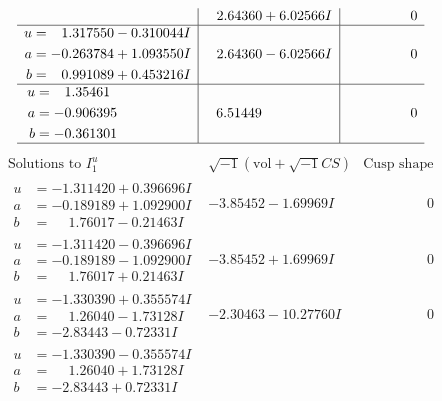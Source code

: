 \documentclass[1p]{elsarticle_modified}
\theoremstyle{definition}
\newcommand{\I}{\sqrt{-1}}
\begin{document}
$$\begin{array}{c|c|c}
 & \phantom{-}2.64360 + 6.02566 I & \phantom{-0.000000 } 0 \\ \hline\begin{aligned}
u &= \phantom{-}1.317550 - 0.310044 I \\
a &= -0.263784 + 1.093550 I \\
b &= \phantom{-}0.991089 + 0.453216 I\end{aligned}
 & \phantom{-}2.64360 - 6.02566 I & \phantom{-0.000000 } 0 \\ \hline\begin{aligned}
u &= \phantom{-}1.35461\phantom{ +0.000000I} \\
a &= -0.906395\phantom{ +0.000000I} \\
b &= -0.361301\phantom{ +0.000000I}\end{aligned}
 & \phantom{-}6.51449\phantom{ +0.000000I} & \phantom{-0.000000 } 0\\
 \hline 
 \end{array}$$\newpage$$\begin{array}{c|c|c}  
\text{Solutions to }I^u_{1}& \I (\text{vol} + \sqrt{-1}CS) & \text{Cusp shape}\\
 \hline 
\begin{aligned}
u &= -1.311420 + 0.396696 I \\
a &= -0.189189 + 1.092900 I \\
b &= \phantom{-}1.76017 - 0.21463 I\end{aligned}
 & -3.85452 - 1.69969 I & \phantom{-0.000000 } 0 \\ \hline\begin{aligned}
u &= -1.311420 - 0.396696 I \\
a &= -0.189189 - 1.092900 I \\
b &= \phantom{-}1.76017 + 0.21463 I\end{aligned}
 & -3.85452 + 1.69969 I & \phantom{-0.000000 } 0 \\ \hline\begin{aligned}
u &= -1.330390 + 0.355574 I \\
a &= \phantom{-}1.26040 - 1.73128 I \\
b &= -2.83443 - 0.72331 I\end{aligned}
 & -2.30463 - 10.27760 I & \phantom{-0.000000 } 0 \\ \hline\begin{aligned}
u &= -1.330390 - 0.355574 I \\
a &= \phantom{-}1.26040 + 1.73128 I \\
b &= -2.83443 + 0.72331 I\end{aligned}

\end{array}$$
\end{document}

